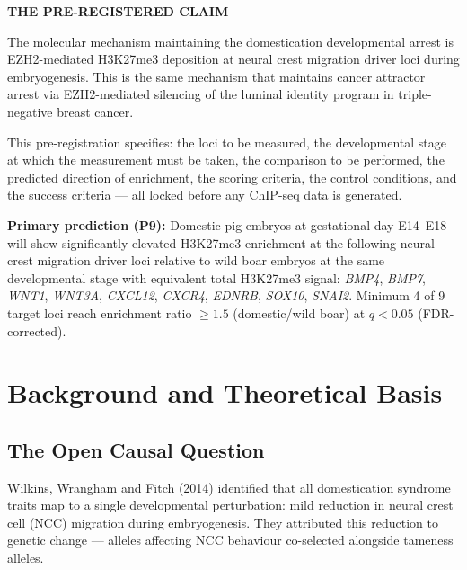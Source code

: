 \documentclass[10pt, a4paper]{article}
\begin{document}
\begin{mdframed}[
  backgroundcolor=claimbox,
  linecolor=claimbox,
  linewidth=0pt,
  innertopmargin=0.7em,
  innerbottommargin=0.7em,
  innerleftmargin=1.0em,
  innerrightmargin=1.0em
]
\color{white}
\textbf{THE PRE-REGISTERED CLAIM}

The molecular mechanism maintaining the
domestication developmental arrest is
EZH2-mediated H3K27me3 deposition at neural
crest migration driver loci during embryogenesis.
This is the same mechanism that maintains
cancer attractor arrest via EZH2-mediated
silencing of the luminal identity program in
triple-negative breast cancer.

\medskip
This pre-registration specifies: the loci to
be measured, the developmental stage at which
the measurement must be taken, the comparison
to be performed, the predicted direction of
enrichment, the scoring criteria, the control
conditions, and the success criteria ---
all locked before any ChIP-seq data is generated.

\medskip
\textbf{Primary prediction (P9):}
Domestic pig embryos at gestational day E14--E18
will show significantly elevated H3K27me3
enrichment at the following neural crest
migration driver loci relative to
wild boar embryos at the same developmental
stage with equivalent total H3K27me3 signal:
\textit{BMP4}, \textit{BMP7}, \textit{WNT1},
\textit{WNT3A}, \textit{CXCL12}, \textit{CXCR4},
\textit{EDNRB}, \textit{SOX10}, \textit{SNAI2}.
Minimum 4 of 9 target loci reach enrichment
ratio $\geq 1.5$ (domestic/wild boar)
at $q < 0.05$ (FDR-corrected).
\end{mdframed}

\vspace{1em}

\section{Background and Theoretical Basis}

\subsection{The Open Causal Question}

Wilkins, Wrangham and Fitch (2014) identified
that all domestication syndrome traits map to
a single developmental perturbation: mild
reduction in neural crest cell (NCC) migration
during embryogenesis. They attributed this
reduction to genetic change --- alleles affecting
NCC behaviour co-selected alongside tameness
alleles.
\end{document}
